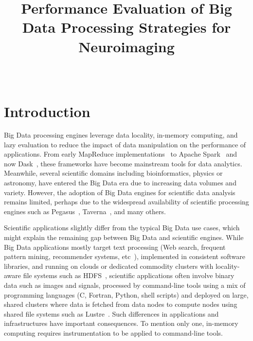 \documentclass{IEEEtran}
\begin{document}
\title{Performance Evaluation of Big Data Processing Strategies for Neuroimaging}

\author{
  \\
}

\maketitle

\begin{abstract}
  
\end{abstract}


\section{Introduction} %

Big Data processing engines leverage data locality, 
in-memory computing, and lazy evaluation to reduce the impact of data 
manipulation on the performance of applications. From early MapReduce 
implementations~\cite{dean2008mapreduce} to Apache Spark~\cite{zaharia2016apache} and now 
Dask~\cite{rocklin2015dask}, these frameworks have become 
mainstream tools for data analytics. Meanwhile, several scientific 
domains including bioinformatics, physics or astronomy, have entered 
the Big Data era due to increasing data volumes and variety. 
However, the adoption of Big Data engines for scientific data analysis 
remains limited, perhaps due to the widespread availability of 
scientific processing engines such as Pegasus~\cite{deelman2005pegasus}, 
Taverna~\cite{oinn2004taverna}, and many others. 

Scientific applications slightly differ from the typical Big Data use 
cases, which might explain the remaining gap between Big Data and 
scientific engines. While Big Data applications mostly target text 
processing (Web search, frequent pattern mining, recommender systems, 
etc~\cite{leskovec2014mining}), implemented in consistent software libraries, and 
running on clouds or dedicated commodity clusters with locality-aware 
file systems such as HDFS~\cite{shvachko2010hadoop}, scientific applications often 
involve binary data such as images and signals, processed by 
command-line tools using a mix of programming languages (C, Fortran, 
Python, shell scripts) and deployed on large, shared clusters where 
data is fetched from data nodes to compute nodes using shared file 
systems such as Lustre~\cite{schwan2003lustre}. Such differences in applications 
and infrastructures have important consequences. To mention only one, 
in-memory computing requires instrumentation to be applied to 
command-line tools.
\end{document}
